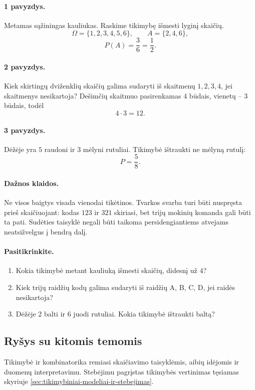 \paragraph{1 pavyzdys.}
Metamas sąžiningas kauliukas. Raskime tikimybę išmesti lyginį skaičių.
\[
\Omega=\{1,2,3,4,5,6\},\qquad A=\{2,4,6\},
\]
\[
P(A)=\frac36=\frac12.
\]

\paragraph{2 pavyzdys.}
Kiek skirtingų dviženklių skaičių galima sudaryti iš skaitmenų $1,2,3,4$, jei skaitmenys nesikartoja?
Dešimčių skaitmuo pasirenkamas $4$ būdais, vienetų -- $3$ būdais, todėl
\[
4\cdot3=12.
\]

\paragraph{3 pavyzdys.}
Dėžėje yra $5$ raudoni ir $3$ mėlyni rutuliai. Tikimybė ištraukti ne mėlyną rutulį:
\[
P=\frac58.
\]

\paragraph{Dažnos klaidos.}
Ne visos baigtys visada vienodai tikėtinos. Tvarkos svarba turi būti nuspręsta prieš skaičiuojant: kodas $123$ ir $321$ skiriasi, bet trijų mokinių komanda gali būti ta pati. Sudėties taisyklė negali būti taikoma persidengiantiems atvejams neatsižvelgus į bendrą dalį.

\paragraph{Pasitikrinkite.}
\begin{enumerate}
\item Kokia tikimybė metant kauliuką išmesti skaičių, didesnį už $4$?
\item Kiek trijų raidžių kodų galima sudaryti iš raidžių A, B, C, D, jei raidės nesikartoja?
\item Dėžėje $2$ balti ir $6$ juodi rutuliai. Kokia tikimybė ištraukti baltą?
\end{enumerate}

\subsection{Ryšys su kitomis temomis}

Tikimybė ir kombinatorika remiasi skaičiavimo taisyklėmis, aibių idėjomis ir duomenų interpretavimu. Stebėjimu pagrįstas tikimybės vertinimas tęsiamas skyriuje \ref{sec:tikimybiniai-modeliai-ir-stebejimas}.

